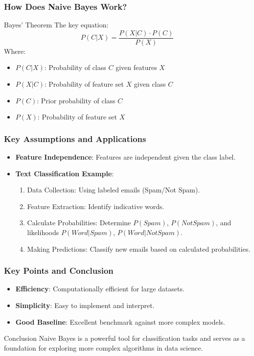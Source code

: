 \documentclass[aspectratio=169]{beamer}
\begin{document}
\begin{frame}[fragile]
    \frametitle{How Does Naive Bayes Work?}
    \begin{block}{Bayes' Theorem}
        The key equation:
        \[
        P(C|X) = \frac{P(X|C) \cdot P(C)}{P(X)}
        \]
        Where:
        \begin{itemize}
            \item \(P(C|X)\): Probability of class \(C\) given features \(X\)
            \item \(P(X|C)\): Probability of feature set \(X\) given class \(C\)
            \item \(P(C)\): Prior probability of class \(C\)
            \item \(P(X)\): Probability of feature set \(X\)
        \end{itemize}
    \end{block}
\end{frame}

\begin{frame}[fragile]
    \frametitle{Key Assumptions and Applications}
    \begin{itemize}
        \item \textbf{Feature Independence}: Features are independent given the class label.
        \item \textbf{Text Classification Example}:
        \begin{enumerate}
            \item Data Collection: Using labeled emails (Spam/Not Spam).
            \item Feature Extraction: Identify indicative words.
            \item Calculate Probabilities: Determine \(P(Spam)\), \(P(Not Spam)\), and likelihoods \(P(Word|Spam)\), \(P(Word|Not Spam)\).
            \item Making Predictions: Classify new emails based on calculated probabilities.
        \end{enumerate}
    \end{itemize}
\end{frame}

\begin{frame}[fragile]
    \frametitle{Key Points and Conclusion}
    \begin{itemize}
        \item \textbf{Efficiency}: Computationally efficient for large datasets.
        \item \textbf{Simplicity}: Easy to implement and interpret.
        \item \textbf{Good Baseline}: Excellent benchmark against more complex models.
    \end{itemize}
    
    \begin{block}{Conclusion}
        Naive Bayes is a powerful tool for classification tasks and serves as a foundation for exploring more complex algorithms in data science.
    \end{block}
\end{frame}
\end{document}
